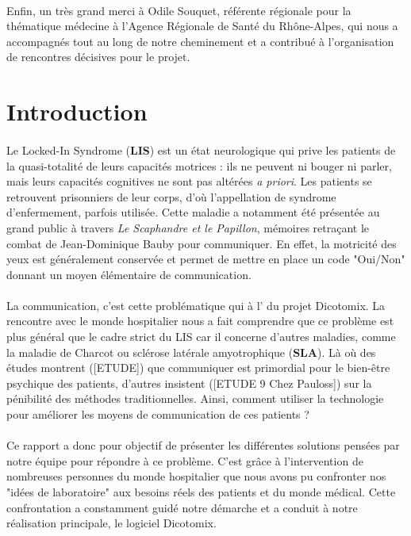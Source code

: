 \documentclass[11pt,a4paper]{article}
\theoremstyle{plain}
\theoremstyle{definition}
\begin{document}
\paragraph{}Enfin, un très grand merci à Odile Souquet, référente régionale pour la thématique médecine à l'Agence Régionale de Santé du Rhône-Alpes, qui nous a accompagnés tout au long de notre cheminement et a contribué à l'organisation de rencontres décisives pour le projet.

\newpage

\tableofcontents

\newpage
\section{Introduction}

\paragraph{} Le Locked-In Syndrome (\textbf{LIS}) est un état neurologique qui prive les patients de la quasi-totalité de leurs capacités motrices : ils ne peuvent ni bouger ni parler,
mais leurs capacités cognitives ne sont pas altérées \textit{a priori}. Les patients se retrouvent prisonniers de leur corps, d'où l'appellation de syndrome d'enfermement, parfois utilisée.
Cette maladie a notamment été présentée au grand public à travers \textit{Le Scaphandre et le Papillon}, mémoires retraçant le combat de Jean-Dominique Bauby pour communiquer. 
En effet, la motricité des yeux est généralement conservée et permet de mettre en place un code "Oui/Non" donnant un moyen élémentaire de communication.

\paragraph{} La communication, c'est cette problématique qui à l' du projet Dicotomix. La rencontre avec le monde hospitalier nous a fait comprendre que ce problème est plus général 
que le cadre strict du LIS car il concerne d'autres maladies, comme la maladie de Charcot ou sclérose latérale amyotrophique (\textbf{SLA}). Là où des études montrent ([ETUDE]) que communiquer est primordial pour le bien-être psychique des patients, d'autres insistent ([ETUDE 9 Chez Pauloss]) sur la pénibilité des méthodes traditionnelles. Ainsi, comment utiliser la technologie pour améliorer les moyens de communication de ces patients ? 

\paragraph{} Ce rapport a donc pour objectif de présenter les différentes solutions pensées par notre équipe pour répondre à ce problème. C'est grâce à l'intervention de nombreuses personnes du monde hospitalier que 
nous avons pu confronter nos "idées de laboratoire" aux besoins réels des patients et du monde médical. Cette confrontation a constamment guidé notre démarche et a conduit à notre réalisation principale, le logiciel Dicotomix.
\end{document}
